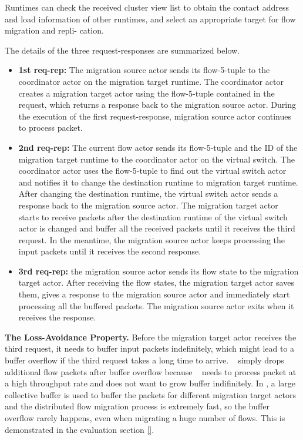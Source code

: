Runtimes can check the received cluster view list to obtain the contact address and load information of other runtimes, and select an appropriate target for flow migration and repli- cation.

The details of the three request-responses are summarized below.
\begin{itemize}

\item \textbf{1st req-rep:} The migration source actor sends its flow-5-tuple to the coordinator actor on the migration target runtime. The coordinator actor creates a migration target actor using the flow-5-tuple contained in the request, which returns a response back to the migration source actor. During the execution of the first request-response, migration source actor continues to process packet.

\item \textbf{2nd req-rep:} The current flow actor sends its flow-5-tuple and the ID of the migration target runtime to the coordinator actor on the virtual switch. The coordinator actor uses the flow-5-tuple to find out the virtual switch actor and notifies it to change the destination runtime to migration target runtime. After changing the destination runtime, the virtual switch actor sends a response back to the migration source actor. The migration target actor starts to receive packets after the destination runtime of the virtual switch actor is changed and buffer all the received packets until it receives the third request. In the meantime, the migration source actor keeps processing the input packets until it receives the second response.

\item \textbf{3rd req-rep:} the migration source actor sends its flow state to the migration target actor. After receiving the flow states, the migration target actor saves them, gives a response to the migration source actor and immediately start processing all the buffered packets. The migration source actor exits when it receives the response.

\end{itemize}

\textbf{The Loss-Avoidance Property.} Before the migration target actor receives the third request, it needs to buffer input packets indefinitely, which might lead to a buffer overflow if the third request takes a long time to arrive. \nfactor~ simply drops additional flow packets after buffer overflow because \nfactor~ needs to process packet at a high throughput rate and does not want to grow buffer indifinitely. In \nfactor, a large collective buffer is used to buffer the packets for different migration target actors and the distributed flow migration process is extremely fast, so the buffer overflow rarely happens, even when migrating a huge number of flows. This is demonstrated in the evaluation section \ref{}.

